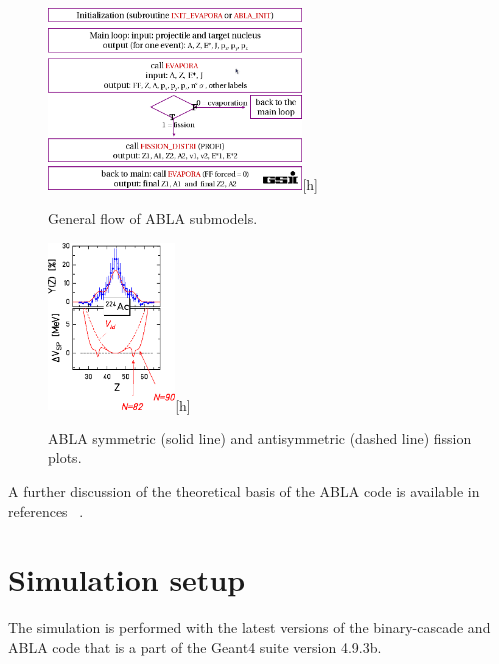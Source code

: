 \begin{figure}[h] 
\begin{center}
\includegraphics[width=0.6\textwidth]{images/AblaTable.png}[h]  
\caption{\label{fig:ablatable} General flow of ABLA submodels.}
 
 \end{center}
 \end{figure}
\begin{figure}[h] 
\begin{center}
\includegraphics[width=0.3\textwidth]{images/AblaHumps.png}[h]  
\caption{\label{fig:ablahumps} ABLA symmetric (solid line) and antisymmetric (dashed line) fission plots.}
 
 \end{center}
 \end{figure}

A further discussion of the theoretical basis of the ABLA code is available in references ~\cite{ablatalk,iia}.

\section{Simulation setup} %
The simulation is performed with the latest versions of the binary-cascade and ABLA code that is a part of the Geant4 suite version 4.9.3b.

